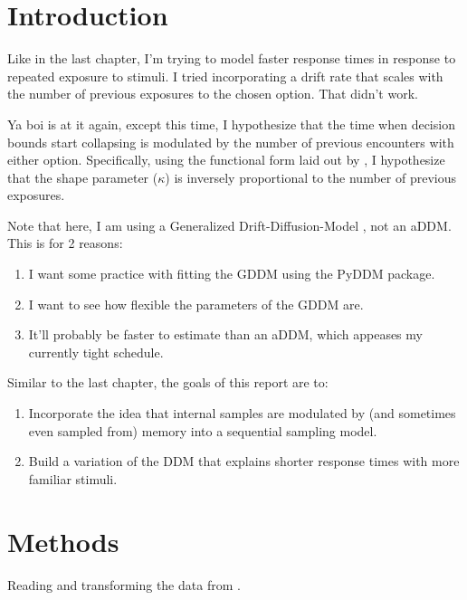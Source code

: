 \documentclass[
]{book}
\begin{document}
\hypertarget{introduction-1}{%
\section{Introduction}\label{introduction-1}}

Like in the last chapter, I'm trying to model faster response times in response to repeated exposure to stimuli. I tried incorporating a drift rate that scales with the number of previous exposures to the chosen option. That didn't work.

Ya boi is at it again, except this time, I hypothesize that the time when decision bounds start collapsing is modulated by the number of previous encounters with either option. Specifically, using the functional form laid out by \citep{hawkins2015}, I hypothesize that the shape parameter (\(\kappa\)) is inversely proportional to the number of previous exposures.

Note that here, I am using a Generalized Drift-Diffusion-Model \citep{shinn2020}, not an aDDM. This is for 2 reasons:

\begin{enumerate}
\def\labelenumi{\arabic{enumi}.}
\item
  I want some practice with fitting the GDDM using the PyDDM package.
\item
  I want to see how flexible the parameters of the GDDM are.
\item
  It'll probably be faster to estimate than an aDDM, which appeases my currently tight schedule.
\end{enumerate}

Similar to the last chapter, the goals of this report are to:

\begin{enumerate}
\def\labelenumi{\arabic{enumi}.}
\item
  Incorporate the idea that internal samples are modulated by (and sometimes even sampled from) memory into a sequential sampling model.
\item
  Build a variation of the DDM that explains shorter response times with more familiar stimuli.
\end{enumerate}

\hypertarget{methods-1}{%
\section{Methods}\label{methods-1}}

Reading and transforming the data from \citep{smith2018}.
\end{document}
